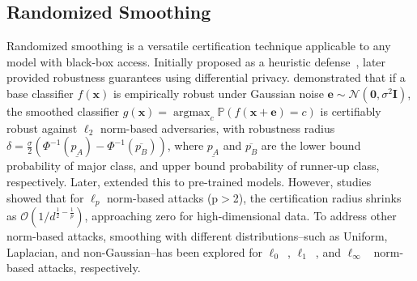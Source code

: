 \subsection{Randomized Smoothing}
\label{rs}
Randomized smoothing is a versatile certification technique applicable to any model with black-box access. Initially proposed as a heuristic defense~\citep{cao2017mitigating,liu2018towards}, \cite{lecuyer2019certifiedrobustnessadversarialexamples} later provided robustness guarantees using differential privacy. \cite{cohen2019certifiedadversarialrobustnessrandomized} demonstrated that if a base classifier $f(\mathbf{x})$ is empirically robust under Gaussian noise $\mathbf{e}\sim\mathcal{N}(\mathbf{0}, \sigma^2\mathbf{I})$, the smoothed classifier $g(\mathbf{x})=\mathop{\arg\max}_c\mathbb{P}(f(\mathbf{x}+\mathbf{e})=c)$ is certifiably robust against $\ell_2$ norm-based adversaries, with robustness radius 
$\delta=\frac{\sigma}{2}(\Phi^{-1}(\underline{p_A})-\Phi^{-1}(\overline{p_B}))$, where $\underline{p_A}$ and $\overline{p_B}$ are the lower bound probability of major class, and upper bound probability of runner-up class, respectively. Later, \cite{salman2020denoised} extended this to pre-trained models. However, studies~\citep{yang2020randomizedsmoothingshapessizes,kumar2020curse} showed that for $\ell_p$ norm-based attacks (p$>$2), the certification radius shrinks as $\mathcal{O}(1/d^{\frac{1}{2}-\frac{1}{p}})$, approaching zero for high-dimensional data. To address other norm-based attacks, smoothing with different distributions--such as Uniform, Laplacian, and non-Gaussian--has been explored for $\ell_0$~\citep{lee2019tight}, $\ell_1$~\citep{teng2020ell_1}, and $\ell_\infty$~\citep{zhang2020filling} norm-based attacks, respectively. 